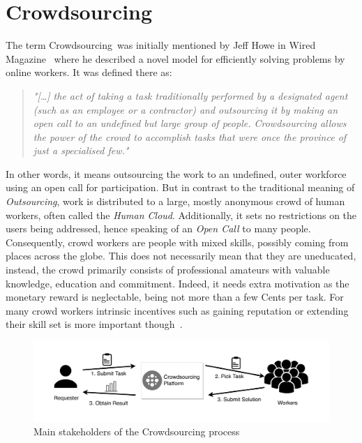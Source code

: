 
\section{Crowdsourcing}\label{sec:state_of_the_art_crowdsourcing}
The term \guillemotright Crowdsourcing\guillemotleft~was initially mentioned by Jeff Howe in Wired Magazine~\cite{howe2006} where he described a novel model for efficiently solving problems by online workers. It was defined there as:
\begin{quotation}
	\textit{"[\ldots] the act of taking a task traditionally performed by a designated agent (such as an employee or a contractor) and outsourcing it by making an open call to an undefined but large group of people.  Crowdsourcing allows the power of the crowd to accomplish tasks that were once the province of just a specialised few."}\cite{howe2008}
\end{quotation}
In other words, it means outsourcing the work to an undefined, outer workforce using an open call for participation. But in contrast to the traditional meaning of \emph{Outsourcing}, work is distributed to a large, mostly anonymous crowd of human workers, often called the \emph{Human Cloud}. Additionally, it sets no restrictions on the users being addressed, hence speaking of an \emph{Open Call} to many people. Consequently, crowd workers are people with mixed skills, possibly coming from places across the globe. This does not necessarily mean that they are uneducated, instead, the crowd primarily consists of professional amateurs with valuable knowledge, education and commitment. Indeed, it needs extra motivation as the monetary reward is neglectable, being not more than a few Cents per task. For many crowd workers intrinsic incentives such as gaining reputation or extending their skill set is more important though~\cite{kaufmann2018}. 

\begin{figure}
	 \centering
	 \includegraphics[width=\textwidth]{drawio/crowdsourcing_scheme}
	 \caption{Main stakeholders of the Crowdsourcing process}
	 \label{fig:crowdsourcing_scheme}
\end{figure}


